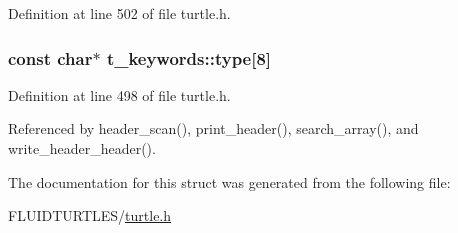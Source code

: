 Definition at line 502 of file turtle.\-h.

\hypertarget{structt__keywords_aa61a0a794bd0f3603eabc95469b7ca3a}{
\subsubsection[{type}]{\setlength{\rightskip}{0pt plus 5cm}const char$\ast$ t\-\_\-keywords\-::type\mbox{[}8\mbox{]}}}\label{structt__keywords_aa61a0a794bd0f3603eabc95469b7ca3a}


Definition at line 498 of file turtle.\-h.



Referenced by header\-\_\-scan(), print\-\_\-header(), search\-\_\-array(), and write\-\_\-header\-\_\-header().



The documentation for this struct was generated from the following file\-:\begin{DoxyCompactItemize}
\item 
F\-L\-U\-I\-D\-T\-U\-R\-T\-L\-E\-S/\hyperlink{turtle_8h}{turtle.\-h}\end{DoxyCompactItemize}
